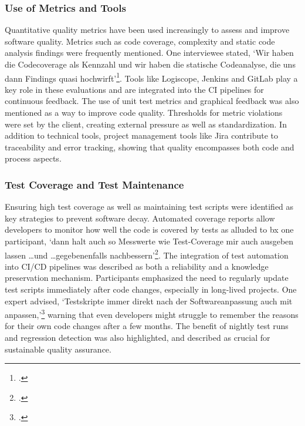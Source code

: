 \subsubsection{Use of Metrics and Tools}
Quantitative quality metrics have been used increasingly to assess and improve software quality. Metrics such as code coverage, complexity and static code analysis findings were frequently mentioned. One interviewee stated, `Wir haben die Codecoverage als Kennzahl und wir haben die statische Codeanalyse,
die uns dann Findings quasi hochwirft'\footcite{Interview32025}. Tools like Logiscope, Jenkins and GitLab play a key role in these evaluations and are integrated into the CI pipelines for continuous feedback.
The use of unit test metrics and graphical feedback was also mentioned as a way to improve code quality. Thresholds for metric violations were set by the client, creating external pressure as well as standardization. In addition to technical tools, project management tools like Jira contribute to traceability and error tracking,
showing that quality encompasses both code and process aspects.

\subsubsection{Test Coverage and Test Maintenance}
Ensuring high test coverage as well as maintaining test scripts were identified as key strategies to prevent software decay. Automated coverage reports allow developers to monitor how well the code is covered by tests as alluded to bx one participant, `dann halt auch so Messwerte wie Test-Coverage mir auch ausgeben lassen \ldots und \ldots gegebenenfalls nachbessern'\footcite{Interview32025}.
The integration of test automation into CI/CD pipelines was described as both a reliability and a knowledge preservation mechanism.
Participants emphasized the need to regularly update test scripts immediately after code changes, especially in long-lived projects. One expert advised, `Testskripte immer direkt nach der Softwareanpassung auch mit anpassen,'\footcite{Interview12025} warning that even developers might struggle to remember the reasons for their own code changes after a few months.
The benefit of nightly test runs and regression detection was also highlighted, and described as crucial for sustainable quality assurance.


